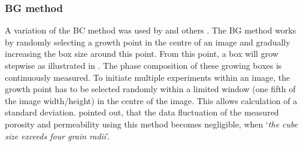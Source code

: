 \subsubsection{\Acl*{BG} method}
\label{sec:box_growth}

A variation of the \ac{BC} method was used by \textcite{kameda.2006} and others \cite{klaver.2012, }. %
The \ac{BG} method works by randomly selecting a growth point in the centre of an image and gradually increasing the box size around this point.
From this point, a box will grow stepwise as illustrated in .
The phase composition of these growing boxes is continuously measured.
To initiate multiple experiments within an image, the growth point has to be selected randomly within a limited window (one fifth of the image width/height) in the centre of the image.
This allows calculation of a standard deviation.
\textcite{kameda.2006} pointed out, that the data fluctuation of the measured porosity and permeability using this method becomes negligible, when `\textit{the cube size exceeds four grain radii}'.





